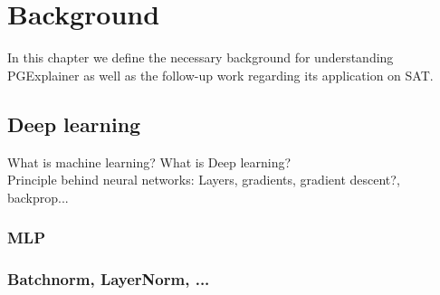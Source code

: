 \chapter{Background}
\label{ch:Background}
In this chapter we define the necessary background for understanding PGExplainer as well as the follow-up work regarding its application on SAT.

\section{Deep learning}
What is machine learning? What is Deep learning? \\
Principle behind neural networks: Layers, gradients, gradient descent?, backprop...
\subsection{MLP}

\subsection{Batchnorm, LayerNorm, ...}



